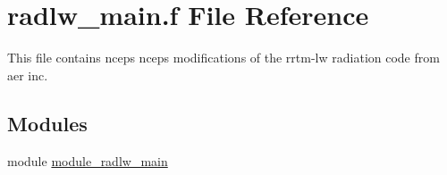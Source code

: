 \hypertarget{radlw__main_8f}{}\section{radlw\+\_\+main.\+f File Reference}
\label{radlw__main_8f}


This file contains ncep\textquotesingle{}s ncep\textquotesingle{}s modifications of the rrtm-\/lw radiation code from aer inc.  


\subsection*{Modules}
\begin{DoxyCompactItemize}
\item 
module \hyperlink{namespacemodule__radlw__main}{module\+\_\+radlw\+\_\+main}
\end{DoxyCompactItemize}
